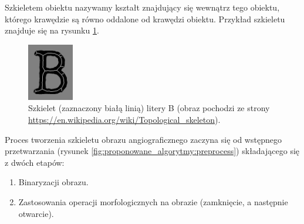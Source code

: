 Szkieletem obiektu nazywamy kształt znajdujący się wewnątrz tego obiektu, którego krawędzie są równo oddalone od krawędzi obiektu. Przykład szkieletu znajduje się na rysunku \ref{fig:proponowane_algorytmy:skel}.

\begin{figure}[htb]
  \centering
  \includegraphics[width=2cm]{gfx/skel}
  \caption{Szkielet (zaznaczony białą linią) litery B (obraz pochodzi ze strony \url{https://en.wikipedia.org/wiki/Topological_skeleton}).}
  \label{fig:proponowane_algorytmy:skel}
\end{figure}

Proces tworzenia szkieletu obrazu angiograficznego zaczyna się od wstępnego przetwarzania (rysunek \ref{fig:proponowane_algorytmy:preprocess}) składającego się z dwóch etapów:

\begin{enumerate}
\item Binaryzacji obrazu.
\item Zastosowania operacji morfologicznych na obrazie (zamknięcie, a następnie otwarcie).
\end{enumerate}

